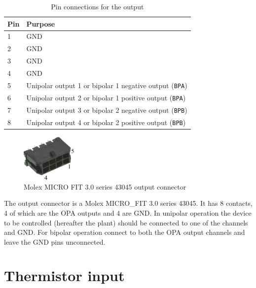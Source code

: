 \documentclass[11pt]{report}
\begin{document}
\begin{table}[H]
	
	\centering

	\begin{tabular}{ll}
	\toprule
	Pin & Purpose  \\ \midrule
	1   & GND      \\
	2   & GND      \\
	3   & GND      \\
	4   & GND      \\
	5   & Unipolar output 1 or bipolar 1 negative output ({\tt BPA}) \\
	6   & Unipolar output 2 or bipolar 1 positive output ({\tt BPA}) \\
	7   & Unipolar output 3 or bipolar 2 negative output ({\tt BPB}) \\
	8   & Unipolar output 4 or bipolar 2 positive output ({\tt BPB}) \\ \bottomrule
	\end{tabular}

	\caption{Pin connections for the output}
	\label{tab:output_pins}

\end{table}

\begin{figure}
\centering
\includegraphics[width=0.25\textwidth]{MicroFit/MicroFit_labelled}
\caption{Molex MICRO FIT 3.0 series 43045 output connector}
\end{figure}

The output connector is a Molex MICRO\_FIT 3.0 series 43045. It has 8 contacts, 4 of which are the OPA outputs and 4 are GND. In unipolar operation the device to be controlled (hereafter the plant) should be connected to one of the channels and GND. For bipolar operation connect to both the OPA output channels and leave the GND pins unconnected. 

\clearpage
\section{Thermistor input}
\end{document}

